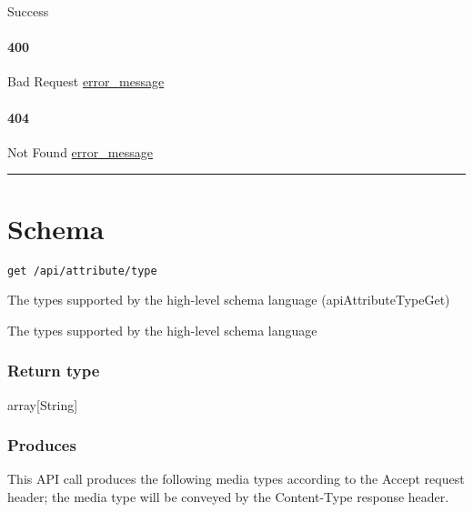 Success \protect\hyperlink{}{}

\hypertarget{section-457}{%
\paragraph{400}\label{section-457}}

Bad Request \protect\hyperlink{error_message}{error\_message}

\hypertarget{section-458}{%
\paragraph{404}\label{section-458}}

Not Found \protect\hyperlink{error_message}{error\_message}

\begin{center}\rule{0.5\linewidth}{\linethickness}\end{center}

\hypertarget{schema-1}{%
\section{\texorpdfstring{\protect\hypertarget{Schema}{}{Schema}}{Schema}}\label{schema-1}}

\protect\hypertarget{apiAttributeTypeGet}{}{}

\begin{verbatim}
get /api/attribute/type
\end{verbatim}

The types supported by the high-level schema language
({apiAttributeTypeGet})

The types supported by the high-level schema language

\hypertarget{return-type-107}{%
\subsubsection{Return type}\label{return-type-107}}

array{[}String{]}

\hypertarget{produces-138}{%
\subsubsection{Produces}\label{produces-138}}

This API call produces the following media types according to the
{Accept} request header; the media type will be conveyed by the
{Content-Type} response header.

